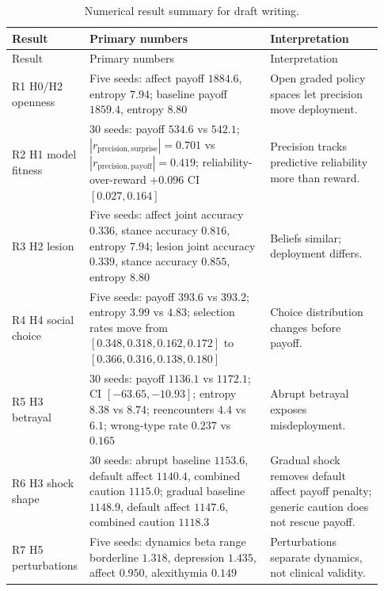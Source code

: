 \begin{longtable}{p{0.15\linewidth}p{0.48\linewidth}p{0.30\linewidth}}
\caption{Numerical result summary for draft writing.}\label{tab:result-summary}\\
\toprule
Result & Primary numbers & Interpretation \\
\midrule
\endfirsthead
\toprule
Result & Primary numbers & Interpretation \\
\midrule
\endhead
R1 H0/H2 openness & Five seeds: affect payoff $1884.6$, entropy $7.94$; baseline payoff $1859.4$, entropy $8.80$ & Open graded policy spaces let precision move deployment. \\
R2 H1 model fitness & 30 seeds: payoff $534.6$ vs $542.1$; $|r_{\mathrm{precision},\mathrm{surprise}}|=0.701$ vs $|r_{\mathrm{precision},\mathrm{payoff}}|=0.419$; reliability-over-reward $+0.096$ CI $[0.027,0.164]$ & Precision tracks predictive reliability more than reward. \\
R3 H2 lesion & Five seeds: affect joint accuracy $0.336$, stance accuracy $0.816$, entropy $7.94$; lesion joint accuracy $0.339$, stance accuracy $0.855$, entropy $8.80$ & Beliefs similar; deployment differs. \\
R4 H4 social choice & Five seeds: payoff $393.6$ vs $393.2$; entropy $3.99$ vs $4.83$; selection rates move from $[0.348,0.318,0.162,0.172]$ to $[0.366,0.316,0.138,0.180]$ & Choice distribution changes before payoff. \\
R5 H3 betrayal & 30 seeds: payoff $1136.1$ vs $1172.1$; CI $[-63.65,-10.93]$; entropy $8.38$ vs $8.74$; reencounters $4.4$ vs $6.1$; wrong-type rate $0.237$ vs $0.165$ & Abrupt betrayal exposes misdeployment. \\
R6 H3 shock shape & 30 seeds: abrupt baseline $1153.6$, default affect $1140.4$, combined caution $1115.0$; gradual baseline $1148.9$, default affect $1147.6$, combined caution $1118.3$ & Gradual shock removes default affect payoff penalty; generic caution does not rescue payoff. \\
R7 H5 perturbations & Five seeds: dynamics beta range borderline $1.318$, depression $1.435$, affect $0.950$, alexithymia $0.149$ & Perturbations separate dynamics, not clinical validity. \\
\bottomrule
\end{longtable}
